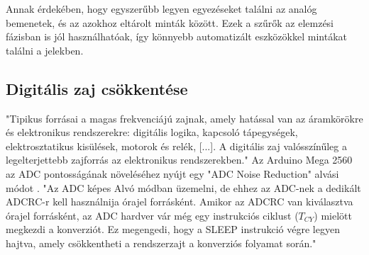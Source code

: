 Annak érdekében, hogy egyszerűbb legyen egyezéseket találni az analóg bemenetek, és az azokhoz eltárolt minták között.
Ezek a szűrők az elemzési fázisban is jól használhatóak, így könnyebb automatizált eszközökkel mintákat találni a jelekben.

\subsection{Digitális zaj csökkentése}
"Tipikus forrásai a magas frekvenciájú zajnak, amely hatással van az áramkörökre és elektronikus rendszerekre: digitális logika, kapcsoló tápegységek, elektrosztatikus kisülések, motorok és relék, [...]. 
A digitális zaj valósszínűleg a legelterjettebb zajforrás az elektronikus rendszerekben."\cite{smith1992high}
Az Arduino Mega 2560 az ADC pontosságának növeléséhez nyújt egy "ADC Noise Reduction" alvási módot \cite{arduino_at_mega_datasheet}. 
"Az ADC képes Alvó módban üzemelni, de ehhez az ADC-nek a dedikált ADCRC-r kell használnija órajel forrásként. 
Amikor az ADCRC van kiválasztva órajel forrásként, az ADC hardver vár még egy instrukciós ciklust ($T_{CY}$) mielött megkezdi a konverziót. 
Ez megengedi, hogy a SLEEP instrukció végre legyen hajtva, amely csökkentheti a rendszerzajt a konverziós folyamat során."\cite{ATmega_processor_datasheet}